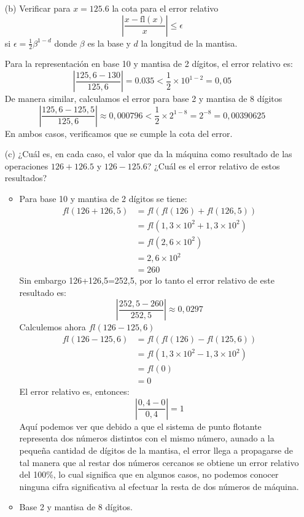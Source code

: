 \documentclass[12pt, a4paper]{article}%
\begin{document}
\begin{itemize}
\begin{itemize}
\begin{solution}
        \end{solution}
    \end{itemize}
    \item[(b)] Verificar para \( x = 125.6 \) la cota para el error relativo
    \[
    \left|\frac{x - \text{fl}(x)}{x}\right| \leq \epsilon
    \]
    si \( \epsilon = \frac{1}{2} \beta^{1-d} \) donde \( \beta \) es la base y \( d \) la longitud de la mantisa.
    \begin{solution}
        Para la representación en base 10 y mantisa de 2 dígitos, el error relativo es:
        \[
        \left|\frac{125,6-130}{125,6}\right|=0.035<\frac{1}{2}\times10^{1-2}=0,05
        \]
        De manera similar, calculamos el error para base 2 y mantisa de 8 dígitos
        \[
        \left|\frac{125,6-125,5}{125,6}\right|\approx 0,000796<\frac{1}{2}\times2^{1-8}=2^{-8}=0,00390625
        \]
        En ambos casos, verificamos que se cumple la cota del error.
    \end{solution}
    \item[(c)] ¿Cuál es, en cada caso, el valor que da la máquina como resultado de las operaciones \( 126 + 126.5 \) y \( 126 - 125.6 \)? ¿Cuál es el error relativo de estos resultados?
    \begin{solution}
        \begin{itemize}
            \item Para base 10 y mantisa de 2 dígitos se tiene:
            \begin{align*}
                fl(126+126,5)&=fl(fl(126)+fl(126,5))\\
                &=fl(1,3\times10^2+1,3\times10^2)\\
                &=fl(2,6\times10^2)\\
                &=2,6\times10^2\\
                &=260
            \end{align*}
            Sin embargo 126+126,5=252,5, por lo tanto el error relativo de este resultado es:
            \[
            \left|\frac{252,5-260}{252,5}\right|\approx 0,0297
            \]
            Calculemos ahora $fl(126-125,6)$
            \begin{align*}
                fl(126-125,6)&=fl(fl(126)-fl(125,6))\\
                &=fl(1,3\times10^2-1,3\times10^2)\\
                &=fl(0)\\
                &=0
            \end{align*}
            El error relativo es, entonces:
            \[
            \left|\frac{0,4-0}{0,4}\right|= 1
            \]
            Aquí podemos ver que debido a que el sistema de punto flotante representa dos números distintos con el mismo número, aunado a la pequeña cantidad de dígitos de la mantisa, el error llega a propagarse de tal manera que al restar dos números cercanos se obtiene un error relativo del 100\%, lo cual significa que en algunos casos, no podemos conocer ninguna cifra significativa al efectuar la resta de dos números de máquina.
            \item Base 2 y mantisa de 8 dígitos. 
            

\end{itemize}
\end{solution}
\end{itemize}
\end{document}
